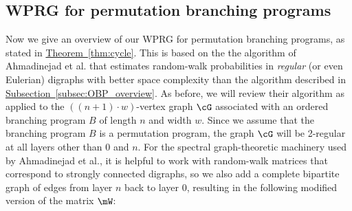 \documentclass[11pt]{article}
\newcommand{\expref}[2]{\texorpdfstring{\hyperref[#2]{#1~\ref{#2}}}{#1~\ref{#2}}}
\begin{document}
    \subsection{WPRG for permutation branching programs}\label{subsec:PBP_proof_overview}
    Now we give an overview of our WPRG for permutation branching programs, as stated in \expref{Theorem}{thm:cycle}. This is based on the
    the algorithm of 
%
Ahmadinejad  %
et al. that estimates random-walk probabilities in \emph{regular} (or even Eulerian) digraphs with better space complexity than the algorithm described in \expref{Subsection}{subsec:OBP_overview}.  As before, we will review their algorithm as applied to the $((n+1)\cdot w)$-vertex graph $\cG$ associated with an ordered branching program $B$ of length $n$ and width $w$.  Since we assume that the branching program $B$ is a permutation program, the graph $\cG$ will be 2-regular at all layers other than $0$ and $n$.  For the spectral graph-theoretic machinery used by 
%
Ahmadinejad  %
et al., it is helpful to work with random-walk matrices that correspond to strongly connected digraphs, so we also add a complete bipartite graph of edges from layer $n$ back to layer $0$, resulting in the following modified version of the matrix $\mW$:
    
\end{document}
